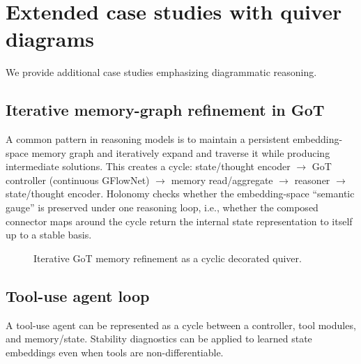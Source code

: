 \documentclass[11pt]{article}
\theoremstyle{definition}
\theoremstyle{plain}
\theoremstyle{remark}
\begin{document}
\section{Extended case studies with quiver diagrams}
\label{app:extended-cases}

We provide additional case studies emphasizing diagrammatic reasoning.

\subsection{Iterative memory-graph refinement in GoT}
A common pattern in reasoning models is to maintain a persistent embedding-space memory graph and iteratively expand and traverse it while producing intermediate solutions.
This creates a cycle:
state/thought encoder $\to$ GoT controller (continuous GFlowNet) $\to$ memory read/aggregate $\to$ reasoner $\to$ state/thought encoder.
Holonomy checks whether the embedding-space ``semantic gauge'' is preserved under one reasoning loop, i.e., whether the composed connector maps around the cycle return the internal state representation to itself up to a stable basis.

\begin{figure}[t]
\centering
{}
\caption{Iterative GoT memory refinement as a cyclic decorated quiver.}
\end{figure}

\subsection{Tool-use agent loop}
A tool-use agent can be represented as a cycle between a controller, tool modules, and memory/state.
Stability diagnostics can be applied to learned state embeddings even when tools are non-differentiable.
\end{document}
